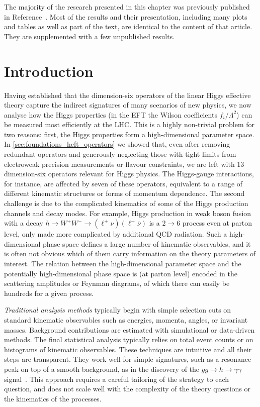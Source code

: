 The majority of the research presented in this chapter was previously
published in Reference~\cite{Brehmer:2016nyr}. Most of the results and
their presentation, including many plots and tables as well as part of
the text, are identical to the content of that article. They are
supplemented with a few unpublished results.



\section{Introduction}
\label{sec:information_intro}

Having established that the dimension-six operators of the linear
Higgs effective theory capture the indirect signatures of many
scenarios of new physics, we now analyse how the Higgs properties (in
the EFT the Wilson coefficients $f_i/\Lambda^2$) can be measured most
efficiently at the LHC. This is a highly non-trivial problem for two
reasons: first, the Higgs properties form a high-dimensional parameter
space. In \autoref{sec:foundations_heft_operators} we showed that,
even after removing redundant operators and generously neglecting
those with tight limits from electroweak precision measurements or
flavour constraints, we are left with 13 dimension-six operators
relevant for Higgs physics. The Higgs-gauge interactions, for
instance, are affected by seven of these operators, equivalent to a
range of different kinematic structures or forms of momentum
dependence. The second challenge is due to the complicated kinematics
of some of the Higgs production channels and decay modes. For example,
Higgs production in weak boson fusion with a decay
$h \to W^+W^- \to (\ell^+ \nu) (\ell^- \overbar{\nu})$ is a $2 \to 6$
process even at parton level, only made more complicated by additional
QCD radiation. Such a high-dimensional phase space defines a large
number of kinematic observables, and it is often not obvious which of
them carry information on the theory parameters of interest. The
relation between the high-dimensional parameter space and the
potentially high-dimensional phase space is (at parton level) encoded
in the scattering amplitudes or Feynman diagrams, of which there can
easily be hundreds for a given process.

\emph{Traditional analysis methods} typically begin with simple
selection cuts on standard kinematic observables such as energies,
momenta, angles, or invariant masses. Background contributions are
estimated with simulational or data-driven methods. The final
statistical analysis typically relies on total event counts or on
histograms of kinematic observables.  These techniques are intuitive
and all their steps are transparent. They work well for simple
signatures, such as a resonance peak on top of a smooth background, as
in the discovery of the $gg \to h \to \gamma \gamma$
signal~\cite{Aad:2012tfa,Chatrchyan:2012xdj}. This approach requires a
careful tailoring of the strategy to each question, and does not scale
well with the complexity of the theory questions or the kinematics of
the processes.

